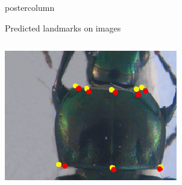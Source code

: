 \begin{frame}
\begin{columns}
\begin{column}{.53\textwidth}
\begin{beamercolorbox}[center,wd=\textwidth]{postercolumn}
\begin{minipage}[T]{.95\textwidth}
{\begin{block}{Predicted landmarks on images}
\begin{columns}
\begin{column}{.45\textwidth}
            			\includegraphics[width=.90\textwidth]{images/Prono_036.eps}
            		\end{column}
            	\end{columns}
            \end{block}
            
            \vfill
            
}
\end{minipage}
\end{beamercolorbox}
\end{column}
\end{columns}
\end{frame}
